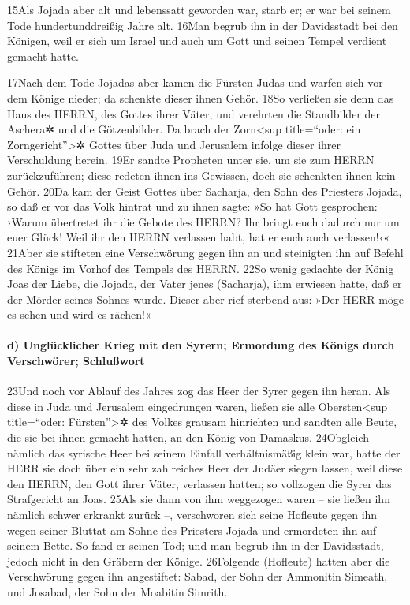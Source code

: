 15Als Jojada aber alt und lebenssatt geworden war, starb er; er war bei
seinem Tode hundertunddreißig Jahre alt. 16Man begrub ihn in der
Davidsstadt bei den Königen, weil er sich um Israel und auch um Gott und
seinen Tempel verdient gemacht hatte.

17Nach dem Tode Jojadas aber kamen die Fürsten Judas und warfen sich vor
dem Könige nieder; da schenkte dieser ihnen Gehör. 18So verließen sie
denn das Haus des HERRN, des Gottes ihrer Väter, und verehrten die
Standbilder der Aschera✲ und die Götzenbilder. Da brach der
Zorn\textless sup title=``oder: ein Zorngericht''\textgreater✲ Gottes
über Juda und Jerusalem infolge dieser ihrer Verschuldung herein. 19Er
sandte Propheten unter sie, um sie zum HERRN zurückzuführen; diese
redeten ihnen ins Gewissen, doch sie schenkten ihnen kein Gehör. 20Da
kam der Geist Gottes über Sacharja, den Sohn des Priesters Jojada, so
daß er vor das Volk hintrat und zu ihnen sagte: »So hat Gott gesprochen:
›Warum übertretet ihr die Gebote des HERRN? Ihr bringt euch dadurch nur
um euer Glück! Weil ihr den HERRN verlassen habt, hat er euch auch
verlassen!‹« 21Aber sie stifteten eine Verschwörung gegen ihn an und
steinigten ihn auf Befehl des Königs im Vorhof des Tempels des HERRN.
22So wenig gedachte der König Joas der Liebe, die Jojada, der Vater
jenes (Sacharja), ihm erwiesen hatte, daß er der Mörder seines Sohnes
wurde. Dieser aber rief sterbend aus: »Der HERR möge es sehen und wird
es rächen!«

\hypertarget{d-ungluxfccklicher-krieg-mit-den-syrern-ermordung-des-kuxf6nigs-durch-verschwuxf6rer-schluuxdfwort}{%
\paragraph{d) Unglücklicher Krieg mit den Syrern; Ermordung des Königs
durch Verschwörer;
Schlußwort}\label{d-ungluxfccklicher-krieg-mit-den-syrern-ermordung-des-kuxf6nigs-durch-verschwuxf6rer-schluuxdfwort}}

23Und noch vor Ablauf des Jahres zog das Heer der Syrer gegen ihn heran.
Als diese in Juda und Jerusalem eingedrungen waren, ließen sie alle
Obersten\textless sup title=``oder: Fürsten''\textgreater✲ des Volkes
grausam hinrichten und sandten alle Beute, die sie bei ihnen gemacht
hatten, an den König von Damaskus. 24Obgleich nämlich das syrische Heer
bei seinem Einfall verhältnismäßig klein war, hatte der HERR sie doch
über ein sehr zahlreiches Heer der Judäer siegen lassen, weil diese den
HERRN, den Gott ihrer Väter, verlassen hatten; so vollzogen die Syrer
das Strafgericht an Joas. 25Als sie dann von ihm weggezogen waren -- sie
ließen ihn nämlich schwer erkrankt zurück --, verschworen sich seine
Hofleute gegen ihn wegen seiner Bluttat am Sohne des Priesters Jojada
und ermordeten ihn auf seinem Bette. So fand er seinen Tod; und man
begrub ihn in der Davidsstadt, jedoch nicht in den Gräbern der Könige.
26Folgende (Hofleute) hatten aber die Verschwörung gegen ihn
angestiftet: Sabad, der Sohn der Ammonitin Simeath, und Josabad, der
Sohn der Moabitin Simrith.

